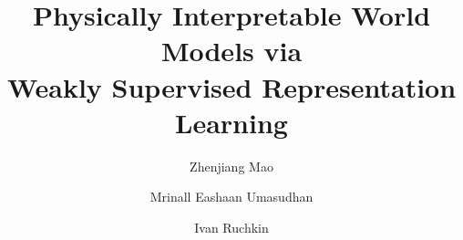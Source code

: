 \documentclass[nonacm,sigconf]{acmart}
\begin{document}
\title{Physically Interpretable World Models via \\ Weakly Supervised Representation Learning}



\author{Zhenjiang Mao}

\author{Mrinall Eashaan Umasudhan}


\author{Ivan Ruchkin}





\renewcommand{\shortauthors}{Mao et al.}
\end{document}
